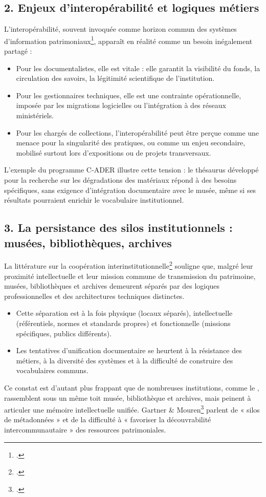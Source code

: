 \subsection*{2. Enjeux d’interopérabilité et logiques métiers}

L’interopérabilité, souvent invoquée comme horizon commun des systèmes d’information patrimoniaux\footcite{hudonISO25964Pour2012a,bermesVersNouveauxCatalogues2016}, apparaît en réalité comme un besoin inégalement partagé :
\begin{itemize}
	\item Pour les documentalistes, elle est vitale : elle garantit la visibilité du fonds, la circulation des savoirs, la légitimité scientifique de l’institution.
	\item Pour les gestionnaires techniques, elle est une contrainte opérationnelle, imposée par les migrations logicielles ou l’intégration à des réseaux ministériels.
	\item Pour les chargés de collections, l’interopérabilité peut être perçue comme une menace pour la singularité des pratiques, ou comme un enjeu secondaire, mobilisé surtout lors d’expositions ou de projets transversaux.
\end{itemize}
L’exemple du programme C-ADER illustre cette tension : le thésaurus développé pour la recherche sur les dégradations des matériaux répond à des besoins spécifiques, sans exigence d’intégration documentaire avec le musée, même si ses résultats pourraient enrichir le vocabulaire institutionnel.

\subsection*{3. La persistance des silos institutionnels : musées, bibliothèques, archives}

La littérature sur la coopération interinstitutionnelle\footcite{gartnerArchivesMuseumsLibraries2019,rossini-paquetBibliothequesMuseesQuellesa,yarrowBibliothequesPubliquesArchives2008a} souligne que, malgré leur proximité intellectuelle et leur mission commune de transmission du patrimoine, musées, bibliothèques et archives demeurent séparés par des logiques professionnelles et des architectures techniques distinctes.
\begin{itemize}
	\item Cette séparation est à la fois physique (locaux séparés), intellectuelle (référentiels, normes et standards propres) et fonctionnelle (missions spécifiques, publics différents).
	\item Les tentatives d’unification documentaire se heurtent à la résistance des métiers, à la diversité des systèmes et à la difficulté de construire des vocabulaires communs.
\end{itemize}
Ce constat est d’autant plus frappant que de nombreuses institutions, comme le \mae, rassemblent sous un même toit musée, bibliothèque et archives, mais peinent à articuler une mémoire intellectuelle unifiée. Gartner \& Mouren\footcite{gartnerArchivesMuseumsLibraries2019} parlent de « silos de métadonnées » et de la difficulté à « favoriser la découvrabilité intercommunautaire » des ressources patrimoniales.


